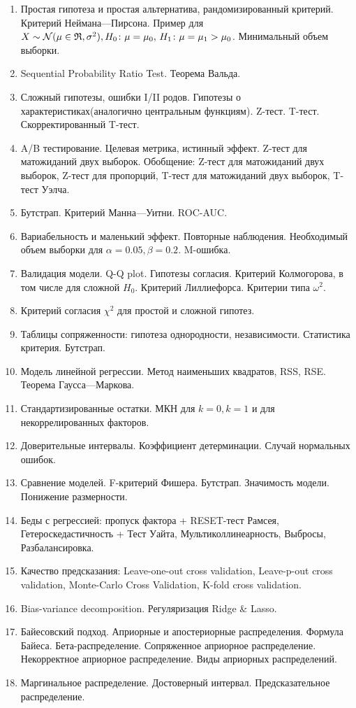 \begin{enumerate}
	\item Простая гипотеза и простая альтернатива, рандомизированный критерий. Критерий Неймана—Пирсона. Пример для $X \sim \mathcal N(\mu \in \mathfrak{R}, \sigma^2), H_0 \colon \mu = \mu_0, \, H_1 \colon \mu = \mu_1 > \mu_0$. Минимальный объем выборки.
	\item Sequential Probability Ratio Test. Теорема Вальда.
	\item Сложный гипотезы, ошибки I/II родов. Гипотезы о характеристиках(аналогично центральным функциям). Z-тест. T-тест. Скорректированный T-тест.

	\item A/B тестирование. Целевая метрика, истинный эффект.  Z-тест для матожиданий двух выборок. Обобщение: Z-тест для матожиданий двух выборок, Z-тест для пропорций, T-тест для матожиданий двух выборок, T-тест Уэлча.
	\item Бутстрап. Критерий Манна—Уитни. ROC-AUC.
	\item Вариабельность и маленький эффект. Повторные наблюдения. Необходимый объем выборки для $\alpha = 0.05, \beta = 0.2$. M-ошибка.

	\item Валидация модели. Q-Q plot. Гипотезы согласия. Критерий Колмогорова, в том числе для сложной $H_0$. Критерий Лиллиефорса. Критерии типа $\omega^2$.
	\item Критерий согласия $\chi^2$ для простой и сложной гипотез.
	
	\item Таблицы сопряженности: гипотеза однородности, независимости. Статистика критерия. Бутстрап.
	\item Модель линейной регрессии. Метод наименьших квадратов, RSS, RSE. Теорема Гаусса—Маркова.
	\item Стандартизированные остатки. МКН для $k = 0, k = 1$ и для некоррелированных факторов.
	\item Доверительные интервалы. Коэффициент детерминации. Случай нормальных ошибок.
	\item Сравнение моделей. F-критерий Фишера. Бутстрап. Значимость модели. Понижение размерности.
	
	\item Беды с регрессией: пропуск фактора + RESET-тест Рамсея, Гетероскедастичность + Тест Уайта, Мультиколлинеарность, Выбросы, Разбалансировка.
	\item Качество предсказания: Leave-one-out cross validation, Leave-p-out cross validation, Monte-Carlo Cross Validation, K-fold cross validation.

	\item Bias-variance decomposition. Регуляризация Ridge \& Lasso.
	\item Байесовский подход. Априорные и апостериорные распределения. Формула Байеса. Бета-распределение. Сопряженное априорное распределение. Некорректное априорное распределение. Виды априорных распределений.
	\item Маргинальное распределение. Достоверный интервал. Предсказательное распределение.
	
\end{enumerate}
